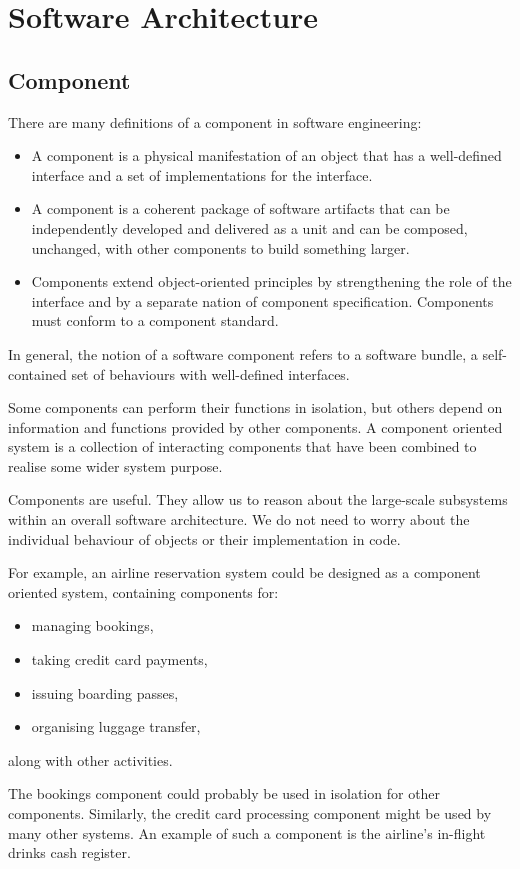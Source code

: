 \documentclass[a4paper, openany]{memoir}
\begin{document}
\chapter{Software Architecture}
\section{Component}
There are many definitions of a component in software engineering:
\begin{itemize}
    \item A component is a physical manifestation of an object that has a well-defined interface and a set of implementations for the interface.
    \item A component is a coherent package of software artifacts that can be independently developed and delivered as a unit and can be composed, unchanged, with other components to build something larger.
    \item Components extend object-oriented principles by strengthening the role of the interface and by a separate nation of component specification. Components must conform to a component standard.
\end{itemize}
In general, the notion of a software component refers to a software bundle, a self-contained set of behaviours with well-defined interfaces.

Some components can perform their functions in isolation, but others depend on information and functions provided by other components. A component oriented system is a collection of interacting components that have been combined to realise some wider system purpose.

Components are useful. They allow us to reason about the large-scale subsystems within an overall software architecture. We do not need to worry about the individual behaviour of objects or their implementation in code.

For example, an airline reservation system could be designed as a component oriented system, containing components for:
\begin{itemize}
    \item managing bookings,
    \item taking credit card payments,
    \item issuing boarding passes, 
    \item organising luggage transfer,
\end{itemize}
along with other activities.

The bookings component could probably be used in isolation for other components. Similarly, the credit card processing component might be used by many other systems. An example of such a component is the airline's in-flight drinks cash register.
\end{document}
